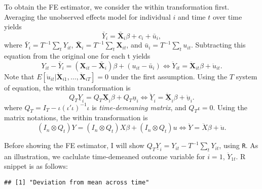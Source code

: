 \documentclass[
  12pt,
]{article}
\newenvironment{Shaded}{\begin{snugshade}}{\end{snugshade}}
\newcommand{\CommentTok}[1]{\textcolor[rgb]{0.56,0.35,0.01}{\textit{#1}}}
\newcommand{\DecValTok}[1]{\textcolor[rgb]{0.00,0.00,0.81}{#1}}
\newcommand{\KeywordTok}[1]{\textcolor[rgb]{0.13,0.29,0.53}{\textbf{#1}}}
\newcommand{\NormalTok}[1]{#1}
\newcommand{\OperatorTok}[1]{\textcolor[rgb]{0.81,0.36,0.00}{\textbf{#1}}}
\newcommand{\StringTok}[1]{\textcolor[rgb]{0.31,0.60,0.02}{#1}}
\begin{document}
To obtain the FE estimator, we consider the within transformation first.
Averaging the unobserved effects model for individual \(i\) and time
\(t\) over time yields \[
  \bar{Y}_i = \bar{\mathbf{X}}_i \beta + c_i + \bar{u}_i,
\] where \(\bar{Y}_i = T^{-1} \sum_t Y_{it}\),
\(\bar{\mathbf{X}}_i = T^{-1} \sum_t \mathbf{X}_{it}\), and
\(\bar{u}_i = T^{-1} \sum_t u_{it}\). Subtracting this equation from the
original one for each t yields \[
  Y_{it} - \bar{Y}_i = (\mathbf{X}_{it} - \bar{\mathbf{X}}_i) \beta + (u_{it} - \bar{u}_i)
  \Leftrightarrow
  \ddot{Y}_{it} = \ddot{\mathbf{X}}_{it} \beta + \ddot{u}_{it}.
\] Note that
\(E[\ddot{u}_{it} | \ddot{\mathbf{X}}_{i1}, \ldots, \ddot{\mathbf{X}}_{iT}] = 0\)
under the first assumption. Using the \(T\) system of equation, the
within transformation is \[
  Q_T \underline{Y}_i = Q_T \underline{\mathbf{X}}_i \beta + Q_T \underline{u}_i
  \Leftrightarrow
  \ddot{\underline{Y}}_i = \ddot{\underline{\mathbf{X}}}_i \beta + \ddot{\underline{u}}_i.
\] where \(Q_T = I_T - \iota (\iota' \iota)^{-1} \iota\) is
\emph{time-demeaning matrix}, and \(Q_T \iota = 0\). Using the matrix
notations, the within transformation is \[
  (I_n \otimes Q_t) Y = (I_n \otimes Q_t) X \beta + (I_n \otimes Q_t) u
  \Leftrightarrow
  \ddot{Y} = \ddot{X} \beta + \ddot{u}.
\]

Before showing the FE estimator, I will show
\(Q_T \underline{Y}_i = Y_{it} - T^{-1} \sum_t Y_{it}\), using
\texttt{R}. As an illustration, we caclulate time-demeaned outcome
variable for \(i = 1\), \(\ddot{Y}_{1t}\). R snippet is as follows:

\begin{Shaded}
\end{Shaded}

\begin{verbatim}
## [1] "Deviation from mean across time"
\end{verbatim}
\end{document}
